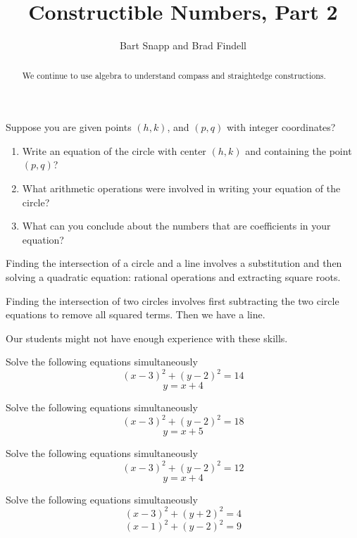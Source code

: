 \documentclass[nooutcomes]{ximera}
\title{Constructible Numbers, Part 2}
\author{Bart Snapp and Brad Findell}
\begin{document}
\begin{abstract}
  We continue to use algebra to understand compass and straightedge
  constructions.
\end{abstract}
\maketitle

\begin{problem}
Suppose you are given points $(h, k)$, and $(p, q)$ with integer coordinates?  
\begin{enumerate}
\item Write an equation of the circle with center $(h, k)$ and containing the point $(p, q)$?  
\item What arithmetic operations were involved in writing your equation of the circle?  
\item What can you conclude about the numbers that are coefficients in your equation?   
\end{enumerate}
\end{problem}

\begin{teachingnote}
Finding the intersection of a circle and a line involves a substitution and then solving a quadratic equation:  rational operations and extracting square roots.  

Finding the intersection of two circles involves first subtracting the two circle equations to remove all squared terms.  Then we have a line.  

Our students might not have enough experience with these skills.  
\end{teachingnote}

\begin{problem}
Solve the following equations simultaneously
$$(x-3)^2+(y-2)^2 = 14$$
$$ y = x + 4$$
\end{problem}


\begin{problem}
Solve the following equations simultaneously
$$(x-3)^2+(y-2)^2 = 18$$
$$ y = x + 5$$
\end{problem}

\begin{problem}
Solve the following equations simultaneously
$$(x-3)^2+(y-2)^2 = 12$$
$$ y = x + 4$$
\end{problem}


\begin{problem}
Solve the following equations simultaneously
$$(x-3)^2+(y+2)^2 = 4$$
$$(x-1)^2+(y-2)^2 = 9$$
\end{problem}
\end{document}
